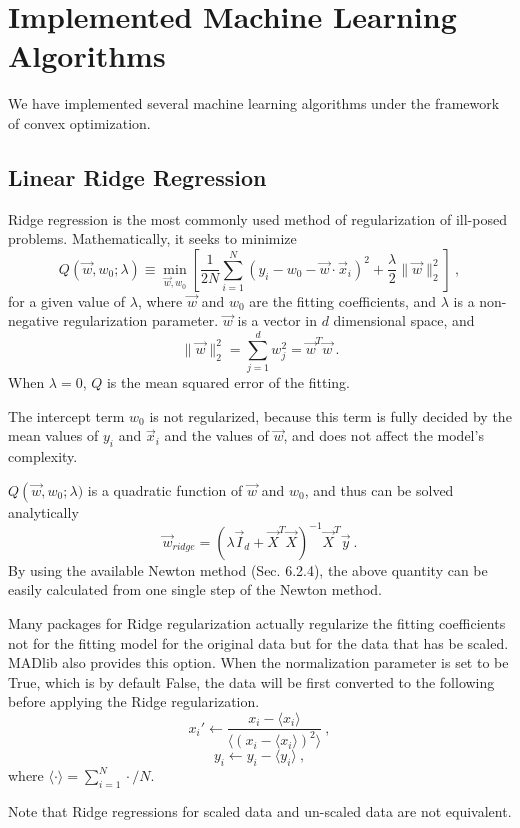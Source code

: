 \section{Implemented Machine Learning Algorithms}

We have implemented several machine learning algorithms under the
framework of convex optimization.

\subsection{Linear Ridge Regression}
Ridge regression is the most commonly used method of regularization of
ill-posed problems. Mathematically, it seeks to minimize 
\begin{equation}
Q\left(\vec{w},w_0;\lambda\right)\equiv \min_{\vec{w},w_0}\left[ \frac{1}{2N} \sum_{i=1}^{N} \left( y_i - w_0 -
    \vec{w} \cdot \vec{x}_i \right)^2
  +\frac{\lambda}{2}\|\vec{w}\|_2^2 \right]\ ,
\end{equation}
for a given value of $\lambda$, where $\vec{w}$ and $w_0$ are the fitting coefficients, and $\lambda$
is a non-negative regularization parameter. $\vec{w}$ is a vector in
$d$ dimensional space, and
\begin{equation}
\|\vec{w}\|_2^2 = \sum_{j=1}^{d}w_j^2 = \vec{w}^T\vec{w}\ .
\end{equation} 
When $\lambda = 0$, $Q$ is
the mean squared error of the fitting. 

The intercept term $w_0$ is not regularized, because this term is
fully decided by the mean values of $y_i$ and $\vec{x}_i$ and the
values of $\vec{w}$, and does not affect the model's complexity.

$Q\left(\vec{w},w_0;\lambda)$ is a quadratic function of $\vec{w}$ and
  $w_0$, and thus can be solved analytically
\begin{equation}
\vec{w}_{ridge}=\left(\lambda\vec{I}_d +
  \vec{X}^T\vec{X}\right)^{-1}\vec{X}^T\vec{y}\ .
\end{equation}
By using the available Newton method (Sec. 6.2.4), the above quantity can be easily
calculated from one single step of the Newton method.

Many packages for Ridge regularization actually regularize the fitting
coefficients not for the fitting model for the original data but for
the data that has be scaled. MADlib also provides this option. When
the normalization parameter is set to be True, which is by default
False, the data will be first converted to the following before
applying the Ridge regularization.
\begin{equation}
  x_i' \leftarrow \frac{x_i - \langle x_i \rangle}{\langle (x_i -
    \langle x_i \rangle)^2\rangle} \ ,
\end{equation}
\begin{equation}
y_i \leftarrow y_i - \langle y_i \rangle \ ,
\end{equation}
where $\langle \cdot \rangle = \sum_{i=1}^{N} \cdot / N$.

Note that Ridge regressions for scaled data and un-scaled data are not equivalent.